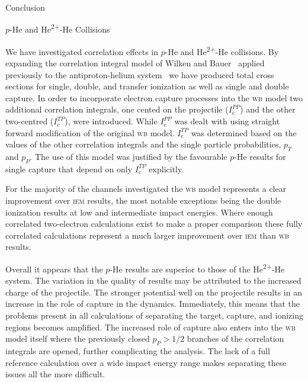 \documentclass[letterpaper, 10 pt]{report}
\begin{document}
\begin{chapter}{Conclusion \label{chap:con}}

   \begin{section}{\texorpdfstring{$p$}{p}-He and \texorpdfstring{He\textsuperscript{2+}}{He2+}-He
                   Collisions \label{sec:con-phe2p-he}}

      We have investigated correlation effects in $p$-He and He\textsuperscript{2+}-He collisions. By
      expanding the correlation integral model of Wilken and Bauer~\cite{wb} applied previously to the
      antiproton-helium system~\cite{pbarhe} we have produced total cross sections for single, double,
      and transfer ionization as well as single and double capture. In order to incorporate electron
      capture processes into the \textsc{wb} model two additional correlation integrals, one cented on
      the projectile ($I^{PP}_\mathrm{c}$) and the other two-centred ($I^{TP}_\mathrm{c}$), were
      introduced. While $I^{PP}_\mathrm{c}$ was dealt with using straight forward modification of the
      original \textsc{wb} model. $I^{TP}_\mathrm{c}$ was determined based on the values of the other
      correlation integrals and the single particle probabilities, $p_T$ and $p_P$. The use of this
      model was justified by the favourable $p$-He results for single capture that depend on only
      $I^{TP}_\mathrm{c}$ explicitly.

      For the majority of the channels investigated the \textsc{wb} model represents a clear improvement
      over \textsc{iem}  results, the most notable exceptions being the double ionization results at low
      and intermediate impact energies. Where enough correlated two-electron calculations exist to make
      a proper comparison these fully correlated calculations represent a much larger improvement over
      \textsc{iem} than \textsc{wb} results.
  
      Overall it appears that the $p$-He results are superior to those of the He\textsuperscript{2+}-He
      system. The variation in the quality of results may be attributed to the increased charge of the
      projectile. The stronger potential well on the projectile results in an increase in the role of
      capture in the dynamics. Immediately, this means that the problems present in all calculations of
      separating the target, capture, and ionizing regions becomes amplified. The increased role of
      capture also enters into the \textsc{wb} model itself where the previously closed $p_P > 1/2$
      branches of the correlation integrals are opened, further complicating the analysis. The lack of a
      full reference calculation over a wide impact energy range makes separating these issues all the
      more difficult.


\end{section}
\end{chapter}
\end{document}
